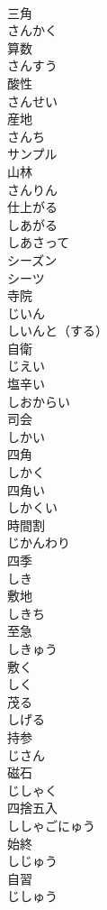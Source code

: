 \documentclass[8pt]{extreport}
\begin{document}
\begin{CJK}{UTF8}{min}
\\	三角 
\\	さんかく	
\\	算数 
\\	さんすう	
\\	酸性 
\\	さんせい	
\\	産地 
\\	さんち	
\\	サンプル	
\\	山林 
\\	さんりん	
\\	仕上がる 
\\	しあがる	
\\	しあさって	
\\	シーズン	
\\	シーツ	
\\	寺院 
\\	じいん	
\\	しいんと（する）	
\\	自衛 
\\	じえい	
\\	塩辛い 
\\	しおからい	
\\	司会 
\\	しかい	
\\	四角 
\\	しかく	
\\	四角い 
\\	しかくい	
\\	時間割 
\\	じかんわり	
\\	四季 
\\	しき	
\\	敷地 
\\	しきち	
\\	至急 
\\	しきゅう	
\\	敷く 
\\	しく	
\\	茂る 
\\	しげる	
\\	持参 
\\	じさん	
\\	磁石 
\\	じしゃく	
\\	四捨五入 
\\	ししゃごにゅう	
\\	始終 
\\	しじゅう	
\\	自習 
\\	じしゅう	

\end{CJK}
\end{document}
